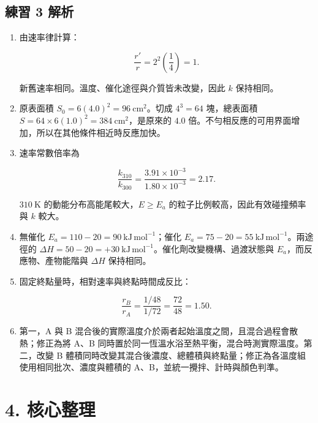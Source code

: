 \documentclass[11pt,a4paper]{article}
\begin{document}
\subsection{練習 3 解析}\label{ux7df4ux7fd2-3-ux89e3ux6790}

\begin{enumerate}
\def\labelenumi{\arabic{enumi}.}
\item
  由速率律計算：

  \[
  \frac{r'}{r}=2^2\left(\frac14\right)=1.
  \]

  新舊速率相同。溫度、催化途徑與介質皆未改變，因此 \(k\) 保持相同。
\item
  原表面積 \(S_0=6(4.0)^2=96\ \mathrm{cm^2}\)。切成 \(4^3=64\) 塊，總表面積 \(S=64\times6(1.0)^2=384\ \mathrm{cm^2}\)，是原來的 \(4.0\) 倍。不勻相反應的可用界面增加，所以在其他條件相近時反應加快。
\item
  速率常數倍率為

  \[
  \frac{k_{310}}{k_{300}}
  =\frac{3.91\times10^{-3}}{1.80\times10^{-3}}
  =2.17.
  \]

  \(310\ \mathrm K\) 的動能分布高能尾較大，\(E\ge E_a\) 的粒子比例較高，因此有效碰撞頻率與 \(k\) 較大。
\item
  無催化 \(E_a=110-20=90\ \mathrm{kJ\,mol^{-1}}\)；催化 \(E_a=75-20=55\ \mathrm{kJ\,mol^{-1}}\)。兩途徑的 \(\Delta H=50-20=+30\ \mathrm{kJ\,mol^{-1}}\)。催化劑改變機構、過渡狀態與 \(E_a\)，而反應物、產物能階與 \(\Delta H\) 保持相同。
\item
  固定終點量時，相對速率與終點時間成反比：

  \[
  \frac{r_B}{r_A}
  =\frac{1/48}{1/72}
  =\frac{72}{48}=1.50.
  \]
\item
  第一，A 與 B 混合後的實際溫度介於兩者起始溫度之間，且混合過程會散熱；修正為將 A、B 同時置於同一恆溫水浴至熱平衡，混合時測實際溫度。第二，改變 B 體積同時改變其混合後濃度、總體積與終點量；修正為各溫度組使用相同批次、濃度與體積的 A、B，並統一攪拌、計時與顏色判準。
\end{enumerate}

\section{4. 核心整理}\label{ux6838ux5fc3ux6574ux7406}
\end{document}
